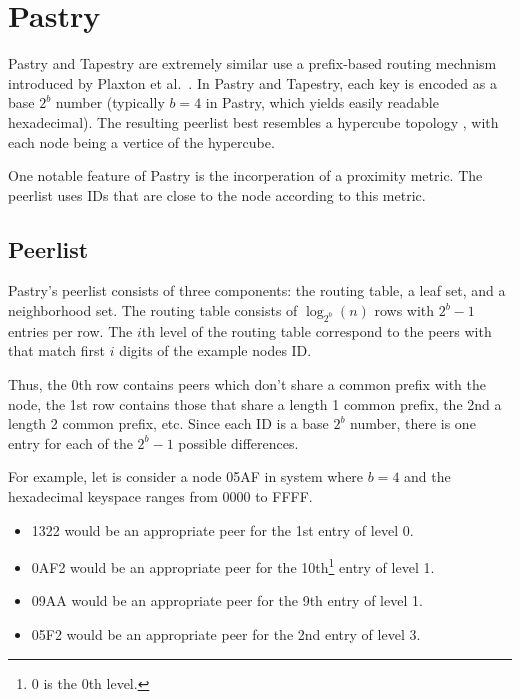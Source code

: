 

\section{Pastry}

Pastry \cite{pastry} and Tapestry \cite{tapestry} are extremely similar use a prefix-based routing mechnism introduced by Plaxton et al.\ \cite{plaxton1999accessing}.
In Pastry and Tapestry, each key is encoded as a base $ 2^{b} $ number (typically $b=4$ in Pastry, which yields easily readable hexadecimal).
The resulting peerlist best resembles a hypercube topology \cite{induced}, with each node being a vertice of the hypercube.

One notable feature of Pastry is the incorperation of a proximity metric.
The peerlist uses IDs that are close to the node according to this metric.

\subsection*{Peerlist}
Pastry's peerlist consists of three components: the routing table, a leaf set, and a neighborhood set.  
The routing table consists of $\log_{2^{b}}(n)$ rows with $2^{b} -1 $ entries per row. 
The $i$th level of the routing table correspond to the peers with that match first $i$ digits of the example nodes ID.

Thus, the 0th row contains peers which don't share a common prefix with the node, the 1st row contains those that share a length 1 common prefix, the 2nd a length 2 common prefix, etc.  
Since each ID is a base $2^b$ number, there is one entry for each of the $2^{b} -1 $ possible differences.   

For example, let is consider a node 05AF in system where $b = 4$ and the hexadecimal keyspace ranges from $0000$ to FFFF.
\begin{itemize}
    \item 1322 would be an appropriate peer for the 1st entry of level 0.
    \item 0AF2 would be an appropriate peer for the 10th\footnote{0 is the 0th level.} entry of level 1.
    \item 09AA would be an appropriate peer for the 9th entry of level 1.	
    \item 05F2 would be an appropriate peer for the 2nd entry of level 3.
\end{itemize}



